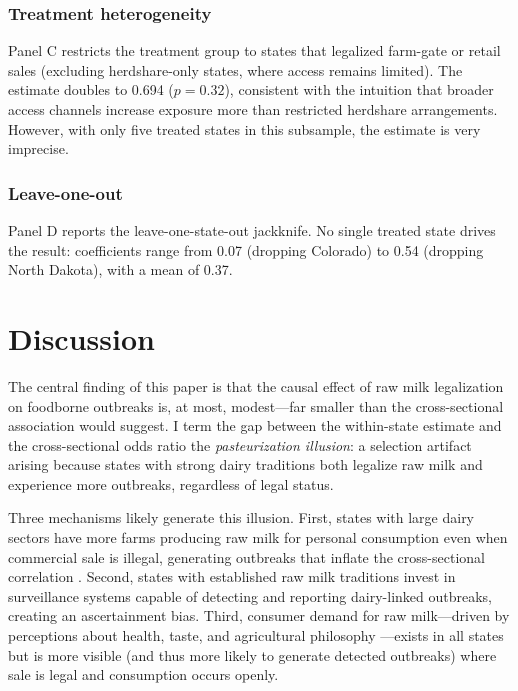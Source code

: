 \documentclass[12pt]{article}
\begin{document}
\subsubsection*{Treatment heterogeneity} Panel C restricts the treatment group to states that legalized farm-gate or retail sales (excluding herdshare-only states, where access remains limited). The estimate doubles to 0.694 ($p = 0.32$), consistent with the intuition that broader access channels increase exposure more than restricted herdshare arrangements. However, with only five treated states in this subsample, the estimate is very imprecise.

\subsubsection*{Leave-one-out} Panel D reports the leave-one-state-out jackknife. No single treated state drives the result: coefficients range from 0.07 (dropping Colorado) to 0.54 (dropping North Dakota), with a mean of 0.37.




\section{Discussion}

The central finding of this paper is that the causal effect of raw milk legalization on foodborne outbreaks is, at most, modest---far smaller than the cross-sectional association would suggest. I term the gap between the within-state estimate and the cross-sectional odds ratio the \textit{pasteurization illusion}: a selection artifact arising because states with strong dairy traditions both legalize raw milk and experience more outbreaks, regardless of legal status.

Three mechanisms likely generate this illusion. First, states with large dairy sectors have more farms producing raw milk for personal consumption even when commercial sale is illegal, generating outbreaks that inflate the cross-sectional correlation \citep{Jayarao2006}. Second, states with established raw milk traditions invest in surveillance systems capable of detecting and reporting dairy-linked outbreaks, creating an ascertainment bias. Third, consumer demand for raw milk---driven by perceptions about health, taste, and agricultural philosophy \citep{Katafiasz2012}---exists in all states but is more visible (and thus more likely to generate detected outbreaks) where sale is legal and consumption occurs openly.
\end{document}
